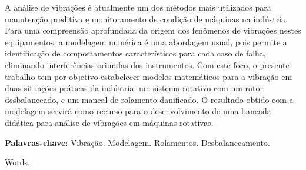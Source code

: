 \imprimircapa
\imprimirfolhaderosto
\clearpage


%	

\begin{resumo}
	\SingleSpacing
	A análise de vibrações é atualmente um dos métodos mais utilizados para manutenção preditiva e monitoramento de condição de máquinas na indústria. 
	Para uma compreensão aprofundada da origem dos fenômenos de vibrações nestes equipamentos, a modelagem numérica é uma abordagem usual, pois permite a identificação de comportamentos característicos para cada caso de falha, eliminando interferências oriundas dos instrumentos.
	Com este foco, o presente trabalho tem por objetivo estabelecer modelos matemáticos para a vibração em duas situações práticas da indústria: um sistema rotativo com um rotor desbalanceado, e um mancal de rolamento danificado.
	O resultado obtido com a modelagem servirá como recurso para o desenvolvimento de uma bancada didática para análise de vibrações em máquinas rotativas.
	\vspace{\onelineskip}
	
	\noindent
	\textbf{Palavras-chave}: Vibração. Modelagem. Rolamentos. Desbalanceamento.
\end{resumo}

%		
	Words.

\listoffigures*
\cleardoublepage

\listofquadros*
\cleardoublepage


\listofsiglas*
\cleardoublepage

\listofsimbolos*
\cleardoublepage

\tableofcontents*
\cleardoublepage
